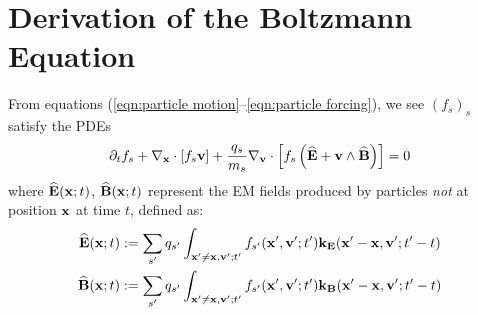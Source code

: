 \chapter{Derivation of the Boltzmann Equation}\label{sec:Boltzmann equation derivation}
    From equations (\ref{eqn:particle motion}–\ref{eqn:particle forcing}), we see $(f_{s})_{s}$ satisfy the PDEs
    \begin{equation}\label{eqn:exact Boltzmann equation}
        \partial_{t}f_{s} + \nabla_{\mathbf{x}}\cdot[f_{s}\mathbf{v}] + \frac{q_{s}}{m_{s}}\nabla_{\mathbf{v}}\cdot\left[f_{s}\left(\widehat{\mathbf{E}} + \mathbf{v}\wedge\widehat{\mathbf{B}}\right)\right]  =  0
    \end{equation}
    where $\widehat{\mathbf{E}}(\mathbf{x}; t)$, $\widehat{\mathbf{B}}(\mathbf{x}; t)$ represent the EM fields produced by particles \emph{not} at position $\mathbf{x}$ at time $t$, defined as:
    \begin{align}
        \widehat{\mathbf{E}}(\mathbf{x}; t)  &:=  \sum_{s'}q_{s'}\int_{\mathbf{x}' \neq \mathbf{x}, \mathbf{v}'; t'}f_{s'}(\mathbf{x}', \mathbf{v}'; t')\mathbf{k}_{\mathbf{E}}(\mathbf{x}' - \mathbf{x}, \mathbf{v}'; t' - t)  \\
        \widehat{\mathbf{B}}(\mathbf{x}; t)  &:=  \sum_{s'}q_{s'}\int_{\mathbf{x}' \neq \mathbf{x}, \mathbf{v}'; t'}f_{s'}(\mathbf{x}', \mathbf{v}'; t')\mathbf{k}_{\mathbf{B}}(\mathbf{x}' - \mathbf{x}, \mathbf{v}'; t' - t)
    \end{align}

